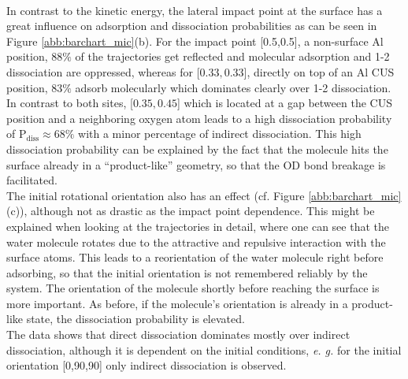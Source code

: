 \documentclass[11pt,DIV=13,BCOR=5mm,a4paper,headinclude]{scrbook}
\begin{document}
\\
In contrast to the kinetic energy, the lateral impact point at the surface has a great influence on adsorption and dissociation probabilities as can be seen in Figure \ref{abb:barchart_mic}(b).
For the impact point [0.5,0.5], a non-surface Al position, $88\%$ of the trajectories get reflected and molecular adsorption and 1-2 dissociation are oppressed, whereas for [$0.33,0.33$], directly on top of an Al CUS position, $83\%$ adsorb molecularly which dominates clearly over 1-2 dissociation.
In contrast to both sites, [$0.35,0.45$] which is located at a gap between the CUS position and a neighboring oxygen atom leads to a high dissociation probability of P$_\textrm{diss}\approx 68\%$ with a minor percentage of indirect dissociation.
This high dissociation probability can be explained by the fact that the molecule hits the surface already in a ``product-like'' geometry, so that the OD bond breakage is facilitated.
\\
The initial rotational orientation also has an effect (cf.
Figure \ref{abb:barchart_mic}(c)), although not as drastic as the impact point dependence.
This might be explained when looking at the trajectories in detail, where one can see that the water molecule rotates due to the attractive and repulsive interaction with the surface atoms.
This leads to a reorientation of the water molecule right before adsorbing, so that the initial orientation is not remembered reliably by the system.
The orientation of the molecule shortly before reaching the surface is more important.
As before, if the molecule's orientation is already in a product-like state, the dissociation probability is elevated.
\\
The data shows that direct dissociation dominates mostly over indirect dissociation, although it is dependent on the initial conditions, \textit{e.
g.} for the initial orientation [0,90,90] only indirect dissociation is observed.

 
\end{document}
